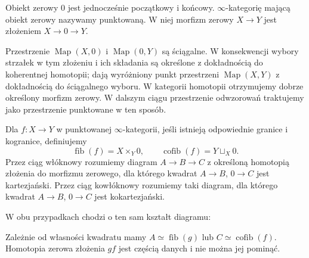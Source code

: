 \begin{definicja}\label{cat:def:stable-pointed}
Obiekt zerowy $0$ jest jednocześnie początkowy i końcowy. $\infty$-kategorię mającą obiekt zerowy nazywamy punktowaną. W niej morfizm zerowy $X\to Y$ jest złożeniem $X\to0\to Y$.
\end{definicja}

Przestrzenie $\operatorname{Map}(X,0)$ i $\operatorname{Map}(0,Y)$ są ściągalne. W konsekwencji wybory strzałek w tym złożeniu i ich składania są określone z dokładnością do koherentnej homotopii; dają wyróżniony punkt przestrzeni $\operatorname{Map}(X,Y)$ z dokładnością do ściągalnego wyboru. W kategorii homotopii otrzymujemy dobrze określony morfizm zerowy. W dalszym ciągu przestrzenie odwzorowań traktujemy jako przestrzenie punktowane w ten sposób.

\begin{definicja}\label{cat:def:stable-fiber-cofiber}
Dla $f:X\to Y$ w punktowanej $\infty$-kategorii, jeśli istnieją odpowiednie granice i kogranice, definiujemy
\[
 \operatorname{fib}(f)=X\times_Y0,\qquad
 \operatorname{cofib}(f)=Y\sqcup_X0.
\]
Przez ciąg włóknowy rozumiemy diagram $A\to B\to C$ z określoną homotopią złożenia do morfizmu zerowego, dla którego kwadrat $A\to B$, $0\to C$ jest kartezjański. Przez ciąg kowłóknowy rozumiemy taki diagram, dla którego kwadrat $A\to B$, $0\to C$ jest kokartezjański.
\end{definicja}

W obu przypadkach chodzi o ten sam kształt diagramu:
\begin{center}
\end{center}
Zależnie od własności kwadratu mamy $A\simeq\operatorname{fib}(g)$ lub $C\simeq\operatorname{cofib}(f)$. Homotopia zerowa złożenia $gf$ jest częścią danych i nie można jej pominąć.

